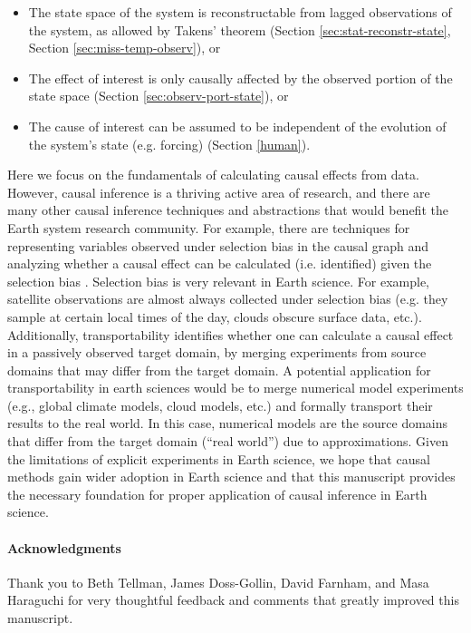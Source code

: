 \documentclass[12pt]{article}
\begin{document}
\begin{itemize}
  \begin{itemize}
  \item The state space of the system is reconstructable
    from lagged observations of the system, as allowed by
    Takens' theorem (Section \ref{sec:stat-reconstr-state}, Section \ref{sec:miss-temp-observ}), or
  \item The effect of interest is only causally
    affected by the observed portion of the state space (Section
    \ref{sec:observ-port-state}), or
  \item The cause of interest can be assumed to be independent of the
    evolution of the system's state (e.g. forcing) (Section
    \ref{human}).
  \end{itemize}
\end{itemize}

Here we focus on the fundamentals of calculating causal effects from
data. However, causal inference is a thriving active area of research,
and there are many other causal inference techniques and abstractions
that would benefit the Earth system research community. For example,
there are techniques for representing variables observed under
selection bias in the causal graph and analyzing whether a causal
effect can be calculated (i.e. identified) given the selection bias
\citep[e.g.,][]{bareinboim2014recovering}. Selection bias is very
relevant in Earth science. For example, satellite observations are
almost always collected under selection bias (e.g. they sample at
certain local times of the day, clouds obscure surface data,
etc.). Additionally, transportability
\citep[e.g.,][]{bareinboim2012transportability} identifies whether one
can calculate a causal effect in a passively observed target domain,
by merging experiments from source domains that may differ from the
target domain. A potential application for transportability in earth
sciences would be to merge numerical model experiments (e.g., global
climate models, cloud models, etc.) and formally transport their
results to the real world. In this case, numerical models are the
source domains that differ from the target domain (``real world'') due
to approximations. Given the limitations of explicit experiments in
Earth science, we hope that causal methods gain wider adoption in
Earth science and that this manuscript provides the necessary
foundation for proper application of causal inference in Earth
science.

\paragraph{Acknowledgments} Thank you to Beth Tellman, James
Doss-Gollin, David Farnham, and Masa Haraguchi for very thoughtful
feedback and comments that greatly improved this manuscript.
\end{document}
